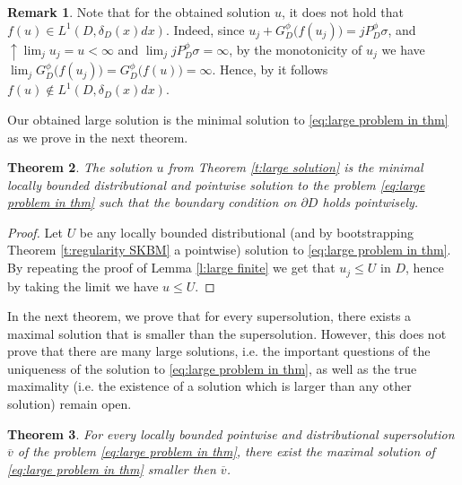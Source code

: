 \documentclass[12pt,a4paper,onecolumn]{amsart}
\newtheorem{thm}{Theorem}[section]
\theoremstyle{definition}
\newtheorem{rem}[thm]{Remark}
\newcommand{\1}{\mathbf 1}
\newcommand{\LLL}{L^1(D,\de(x)dx)}
\newcommand{\GDfi}{G^\phi_{ D}}
\newcommand{\GDFI}{\GDfi}
\newcommand{\PDfi}{P^\phi_{ D}}
\newcommand{\PDFI}{\PDfi}
\newcommand{\de}{\delta_D}
\numberwithin{equation}{section}
\begin{document}
\begin{rem}
    Note that for the obtained solution $u$, it does not hold that $f(u)\in \LLL$. Indeed, since $u_j+\GDFI\big(f({u_j})\big)=j\PDFI\sigma$, and $\uparrow \lim_ju_j=u<\infty$ and $\lim_j j\PDFI\sigma=\infty$, by the monotonicity of $u_j$ we have $\lim_j\GDFI\big(f({u_j})\big)=\GDFI\big(f({u})\big)=\infty$. Hence, by \cite[Lemma 2.8]{Bio23} it follows $f(u)\not\in \LLL$.
\end{rem}
Our obtained large solution is the minimal solution to \eqref{eq:large problem in thm} as we prove in the next theorem.
\begin{thm}\label{t:minimal large sol}
    The solution $u$ from Theorem \ref{t:large solution} is the minimal locally bounded distributional and pointwise solution to the problem \eqref{eq:large problem in thm} such that the boundary condition on $\partial D$ holds pointwisely.
\end{thm}
\begin{proof}
    Let $U$ be any locally bounded distributional (and by bootstrapping Theorem \ref{t:regularity SKBM} a pointwise) solution to \eqref{eq:large problem in thm}. By repeating the proof of Lemma \ref{l:large finite} we get that $u_j\le U$ in $D$, hence by taking the limit we have $u\le U$.
\end{proof}

In the next theorem, we prove that for every supersolution, there exists a maximal solution that is smaller than the supersolution. However, this does not prove that there are many large solutions, i.e. the important questions of the uniqueness of the solution to \eqref{eq:large problem in thm}, as well as the true maximality (i.e. the existence of a solution which is larger than any other solution) remain open.

\begin{thm}\label{t:maximal large sol}
    For every locally bounded pointwise and distributional supersolution $\overline v$ of the problem \eqref{eq:large problem in thm}, there exist the maximal solution of \eqref{eq:large problem in thm} smaller then $\overline v$.
\end{thm}
\end{document}
